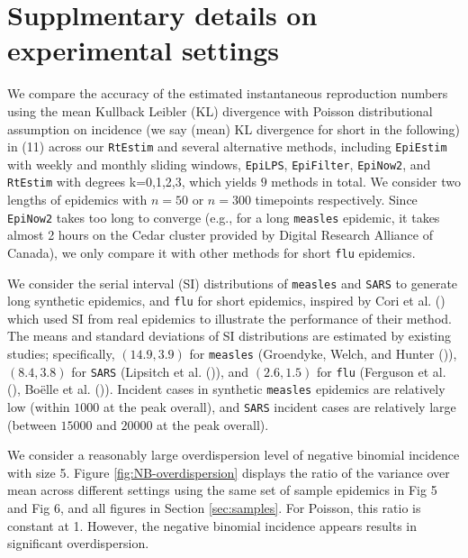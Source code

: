 \documentclass[
]{article}
\begin{document}
\section{Supplmentary details on experimental settings}\label{supplmentary-details-on-experimental-settings}

We compare the accuracy of the estimated instantaneous reproduction numbers using
the mean Kullback Leibler (KL) divergence with Poisson distributional assumption
on incidence (we say (mean) KL divergence for short in the following) in (11) across
our \texttt{RtEstim} and several alternative
methods, including \texttt{EpiEstim} with weekly and monthly sliding windows, \texttt{EpiLPS},
\texttt{EpiFilter}, \texttt{EpiNow2}, and \texttt{RtEstim} with degrees k=0,1,2,3, which yields \(9\)
methods in total. We consider two lengths of epidemics with \(n=50\) or \(n=300\)
timepoints respectively. Since \texttt{EpiNow2} takes too long to converge (e.g., for
a long \texttt{measles} epidemic, it takes almost 2 hours on the
Cedar cluster provided by Digital Research Alliance of Canada), we only compare it with
other methods for short \texttt{flu} epidemics.

We consider the serial interval (SI) distributions of \texttt{measles} and \texttt{SARS} to generate
long synthetic epidemics, and \texttt{flu} for short epidemics, inspired by Cori et al. ()
which used SI from real epidemics to illustrate the performance of their method.
The means and standard deviations of SI distributions are estimated by existing
studies; specifically, \((14.9, 3.9)\) for \texttt{measles} (Groendyke, Welch, and Hunter ()),
\((8.4,3.8)\) for \texttt{SARS} (Lipsitch et al. ()), and \((2.6,1.5)\) for
\texttt{flu} (Ferguson et al. (), Boëlle et al. ()).
Incident cases in synthetic \texttt{measles} epidemics are relatively low (within \(1000\) at
the peak overall), and \texttt{SARS} incident cases are relatively large (between \(15000\)
and \(20000\) at the peak overall).

We consider a reasonably large
overdispersion level of negative binomial incidence with size 5. Figure
\ref{fig:NB-overdispersion} displays the ratio of the variance over
mean across different settings
using the same set of sample epidemics in Fig 5 and Fig 6, and all figures in
Section \ref{sec:samples}. For Poisson, this ratio is constant at 1. However,
the negative binomial incidence appears results in significant overdispersion.
\end{document}
